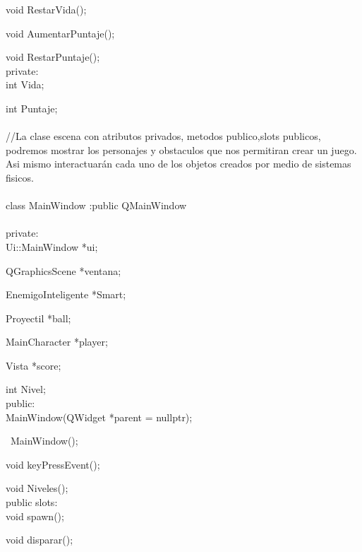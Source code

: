 \documentclass{article}
\begin{document}
    void RestarVida();
    
    void AumentarPuntaje();
    
    void RestarPuntaje();\\
private:\\

    int Vida;
    
    int Puntaje;\\
\rbrace\\

//La clase escena con atributos privados, metodos publico,slots publicos, podremos mostrar los personajes y obstaculos que nos permitiran crear un juego. Asi mismo interactuarán cada uno de los objetos creados por medio de sistemas fisicos.\\
\\
class MainWindow :public QMainWindow\\
\lbrace\\ 
private:\\

    Ui::MainWindow *ui;

    QGraphicsScene *ventana;

    EnemigoInteligente *Smart;

    Proyectil *ball;

    MainCharacter *player;

    Vista *score;

    int Nivel;\\
public:\\

    MainWindow(QWidget *parent = nullptr);
    
    ~MainWindow();

    void keyPressEvent();
    
    void Niveles();\\
public slots:\\

    void spawn();

    void disparar();\\
\rbrace\\
\end{document}
